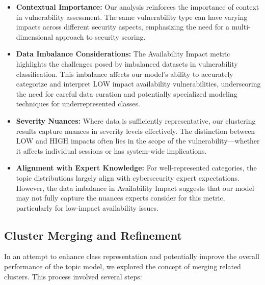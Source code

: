 \documentclass[12pt]{article}
\begin{document}
\begin{itemize}

	\item \textbf{Contextual Importance:} Our analysis reinforces the importance of context in
	      vulnerability assessment. The same vulnerability type can have varying impacts across
	      different security aspects, emphasizing the need for a multi-dimensional approach to
	      security scoring.

	\item \textbf{Data Imbalance Considerations:} The Availability Impact metric highlights the
	      challenges posed by imbalanced datasets in vulnerability classification. This imbalance
	      affects our model's ability to accurately categorize and interpret LOW impact availability
	      vulnerabilities, underscoring the need for careful data curation and potentially specialized
	      modeling techniques for underrepresented classes.

	\item \textbf{Severity Nuances:} Where data is sufficiently representative, our clustering
	      results capture nuances in severity levels effectively. The distinction between LOW and HIGH
	      impacts often lies in the scope of the vulnerability---whether it affects individual
	      sessions or has system-wide implications.

	\item \textbf{Alignment with Expert Knowledge:} For well-represented categories, the topic
	      distributions largely align with cybersecurity expert expectations. However, the data
	      imbalance in Availability Impact suggests that our model may not fully capture the nuances
	      experts consider for this metric, particularly for low-impact availability issues.

\end{itemize}

\subsection{Cluster Merging and Refinement}

In an attempt to enhance class representation and potentially improve the overall performance of the
topic model, we explored the concept of merging related clusters. This process involved several steps:
\end{document}

